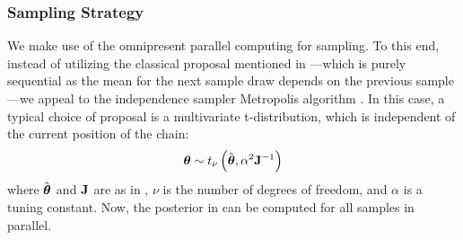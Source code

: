 \subsubsection{Sampling Strategy} 
We make use of the omnipresent parallel computing for sampling. To this end, instead of utilizing the classical proposal mentioned in ---which is purely sequential as the mean for the next sample draw depends on the previous sample---we appeal to the independence sampler Metropolis algorithm \cite{gelman2004}. In this case, a typical choice of proposal is a multivariate t-distribution, which is independent of the current position of the chain:
\begin{equation} \elabel{proposal}
  \vparam \sim \studentst{\nu}{\hat{\vparam}}{\alpha^2 \mOI^{-1}}
\end{equation}
where $\hat{{\boldsymbol\theta}}$ and $\mathbf{J}$ are as in , $\nu$ is the number of degrees of freedom, and $\alpha$ is a tuning constant. Now, the posterior in  can be computed for all samples in parallel.

